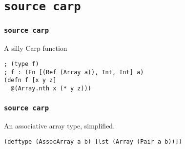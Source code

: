 \documentclass{beamer}
\begin{document}
  \section{\texttt{source carp}}
  \begin{frame}[fragile]
  \frametitle{\texttt{source carp}}
    \begin{listing}[H]
      \caption{A silly Carp function}
      \begin{verbatim}
; (type f)
; f : (Fn [(Ref (Array a)), Int, Int] a)
(defn f [x y z]
  @(Array.nth x (* y z)))
      \end{verbatim}
    \end{listing}
  \end{frame}
  \begin{frame}[fragile]
    \frametitle{\texttt{source carp}}
    \begin{listing}[H]
      \caption{An associative array type, simplified.}
      \begin{verbatim}
(deftype (AssocArray a b) [lst (Array (Pair a b))])
      \end{verbatim}
    \end{listing}
  \end{frame}
\end{document}
